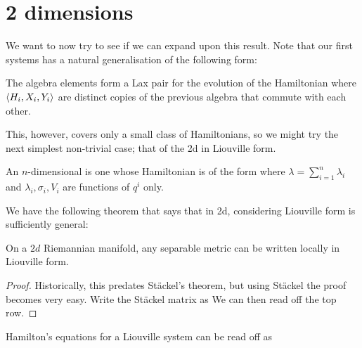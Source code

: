 \documentclass{article}
\begin{document}
\section{2 dimensions}
We want to now try to see if we can expand upon this result. Note that our first systems has a natural generalisation of the following form:
\begin{prop}
The algebra elements 
form a Lax pair for the evolution of the Hamiltonian 
where $\left\langle H_i,X_i,Y_i \right\rangle$ are distinct copies of the previous algebra that commute with each other. 
\end{prop}
This, however, covers only a small class of Hamiltonians, so we might try the next simplest non-trivial case; that of the 2d in Liouville form.
\begin{definition}
	An $n$-dimensional  is one whose Hamiltonian is of the form 
where $\lambda = \sum_{i=1}^n \lambda_i$ and $\lambda_i,\sigma_i,V_i$ are functions of $q^i$ only.
\end{definition}
We have the following theorem that says that in 2d, considering Liouville form is sufficiently general:
\begin{theorem}
	On a $2d$ Riemannian manifold, any separable metric can be written locally in Liouville form. 
\end{theorem}
\begin{proof}
	Historically, this predates St\"ackel's theorem, but using St\"ackel the proof becomes very easy. Write the St\"ackel matrix as 
We can then read off the top row. 
\end{proof}
Hamilton's equations for a Liouville system can be read off as 
\end{document}
